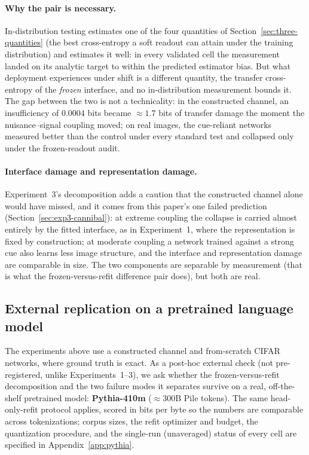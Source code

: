 \documentclass[twocolumn,10pt]{article}
\theoremstyle{definition}
\theoremstyle{remark}
\begin{document}
\paragraph{Why the pair is necessary.} In-distribution testing
estimates one of the four quantities of
Section~\ref{sec:three-quantities} (the best cross-entropy a soft
readout can attain under the training distribution) and estimates
it well: in every validated cell the measurement landed on its
analytic target to within the predicted estimator bias. But what
deployment experiences under shift is a different quantity, the
transfer cross-entropy of the \emph{frozen} interface, and no
in-distribution measurement bounds it. The gap between the two is not
a technicality: in the constructed channel, an insufficiency of
$0.0004$ bits became $\approx 1.7$ bits of transfer damage the moment
the nuisance--signal coupling moved; on real images, the cue-reliant
networks measured better than the control under every standard test
and collapsed only under the frozen-readout audit.

\paragraph{Interface damage and representation damage.} Experiment~3's
decomposition adds a caution that the constructed channel alone would
have missed, and it comes from this paper's one failed prediction
(Section~\ref{sec:exp3-cannibal}): at extreme coupling the collapse
is carried almost entirely by the fitted interface, as in
Experiment~1, where the representation is fixed by construction; at
moderate coupling a network trained against a strong cue also learns
less image structure, and the interface and representation damage are
comparable in size. The two components are separable by measurement
(that is what the frozen-versus-refit difference pair does), but
both are real.

\subsection{External replication on a pretrained language model}
\label{sec:pythia}

The experiments above use a constructed channel and from-scratch CIFAR
networks, where ground truth is exact. As a post-hoc external check (not
pre-registered, unlike Experiments~1--3), we ask whether the
frozen-versus-refit decomposition and the two failure modes it separates
survive on a real, off-the-shelf pretrained model: \textbf{Pythia-410m}
($\approx 300$B Pile tokens). The same head-only-refit protocol applies,
scored in bits per byte so the numbers are comparable across tokenizations;
corpus sizes, the refit optimizer and budget, the quantization procedure,
and the single-run (unaveraged) status of every cell are specified in
Appendix~\ref{app:pythia}.
\end{document}
